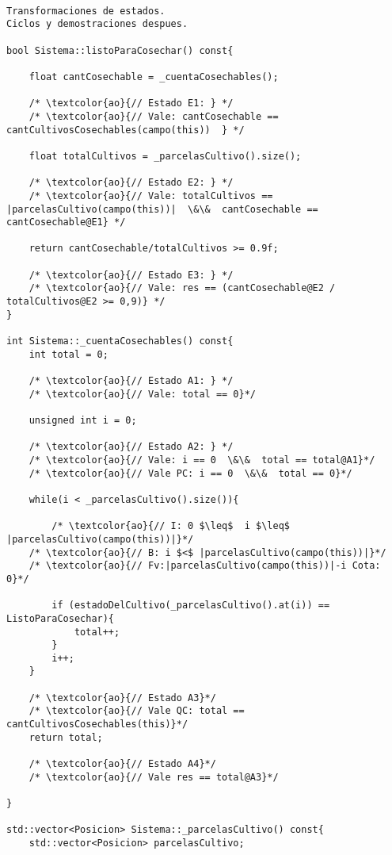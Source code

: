 \begin{lstlisting}

Transformaciones de estados.
Ciclos y demostraciones despues.

bool Sistema::listoParaCosechar() const{
     
    float cantCosechable = _cuentaCosechables();
	
	/* \textcolor{ao}{// Estado E1: } */
    /* \textcolor{ao}{// Vale: cantCosechable == cantCultivosCosechables(campo(this))  } */

    float totalCultivos = _parcelasCultivo().size();
    
    /* \textcolor{ao}{// Estado E2: } */
    /* \textcolor{ao}{// Vale: totalCultivos == |parcelasCultivo(campo(this))|  \&\&  cantCosechable == cantCosechable@E1} */
    
    return cantCosechable/totalCultivos >= 0.9f;
    
    /* \textcolor{ao}{// Estado E3: } */
    /* \textcolor{ao}{// Vale: res == (cantCosechable@E2 / totalCultivos@E2 >= 0,9)} */
}

int Sistema::_cuentaCosechables() const{
    int total = 0;
	
	/* \textcolor{ao}{// Estado A1: } */
    /* \textcolor{ao}{// Vale: total == 0}*/
    
    unsigned int i = 0;

	/* \textcolor{ao}{// Estado A2: } */
    /* \textcolor{ao}{// Vale: i == 0  \&\&  total == total@A1}*/
    /* \textcolor{ao}{// Vale PC: i == 0  \&\&  total == 0}*/
    
    while(i < _parcelasCultivo().size()){
		
    	/* \textcolor{ao}{// I: 0 $\leq$  i $\leq$ |parcelasCultivo(campo(this))|}*/
	/* \textcolor{ao}{// B: i $<$ |parcelasCultivo(campo(this))|}*/
	/* \textcolor{ao}{// Fv:|parcelasCultivo(campo(this))|-i Cota: 0}*/    	
    	
        if (estadoDelCultivo(_parcelasCultivo().at(i)) == ListoParaCosechar){
            total++;
        }
        i++;
    }

    /* \textcolor{ao}{// Estado A3}*/	    
    /* \textcolor{ao}{// Vale QC: total == cantCultivosCosechables(this)}*/    
    return total;
    
    /* \textcolor{ao}{// Estado A4}*/    
    /* \textcolor{ao}{// Vale res == total@A3}*/    
    
}

std::vector<Posicion> Sistema::_parcelasCultivo() const{
    std::vector<Posicion> parcelasCultivo;


\end{lstlisting}
